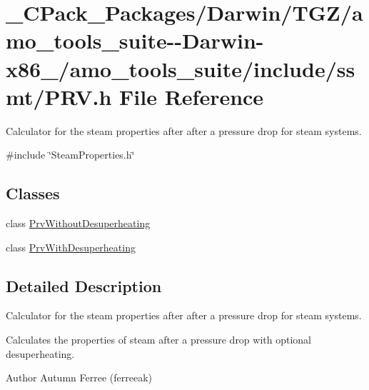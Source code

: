 \hypertarget{___c_pack___packages_2_darwin_2_t_g_z_2amo__tools__suite--_darwin-x86__64_2amo__tools__suite_2include_2ssmt_2_p_r_v_8h}{}\section{\+\_\+\+C\+Pack\+\_\+\+Packages/\+Darwin/\+T\+G\+Z/amo\+\_\+tools\+\_\+suite-\/-\/\+Darwin-\/x86\+\_/amo\+\_\+tools\+\_\+suite/include/ssmt/\+P\+RV.h File Reference}
\label{___c_pack___packages_2_darwin_2_t_g_z_2amo__tools__suite--_darwin-x86__64_2amo__tools__suite_2include_2ssmt_2_p_r_v_8h}


Calculator for the steam properties after after a pressure drop for steam systems.  


{\ttfamily \#include \char`\"{}Steam\+Properties.\+h\char`\"{}}\newline
\subsection*{Classes}
\begin{DoxyCompactItemize}
\item 
class \hyperlink{class_prv_without_desuperheating}{Prv\+Without\+Desuperheating}
\item 
class \hyperlink{class_prv_with_desuperheating}{Prv\+With\+Desuperheating}
\end{DoxyCompactItemize}


\subsection{Detailed Description}
Calculator for the steam properties after after a pressure drop for steam systems. 

Calculates the properties of steam after a pressure drop with optional desuperheating.

\begin{DoxyAuthor}{Author}
Autumn Ferree (ferreeak) 
\end{DoxyAuthor}
